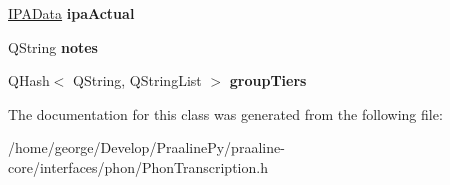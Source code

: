 \begin{DoxyCompactItemize}
\hyperlink{class_phon_transcription_1_1_i_p_a_data}{I\+P\+A\+Data} {\bfseries ipa\+Actual}
\item 
\mbox{\label{class_phon_transcription_1_1_segment_ab90ee96d4dab3a55efebc0a30e935cdc}} 
Q\+String {\bfseries notes}
\item 
\mbox{\label{class_phon_transcription_1_1_segment_a658972babe6e6e0af129821a9f502bcf}} 
Q\+Hash$<$ Q\+String, Q\+String\+List $>$ {\bfseries group\+Tiers}
\end{DoxyCompactItemize}


The documentation for this class was generated from the following file\+:\begin{DoxyCompactItemize}
\item 
/home/george/\+Develop/\+Praaline\+Py/praaline-\/core/interfaces/phon/Phon\+Transcription.\+h\end{DoxyCompactItemize}
